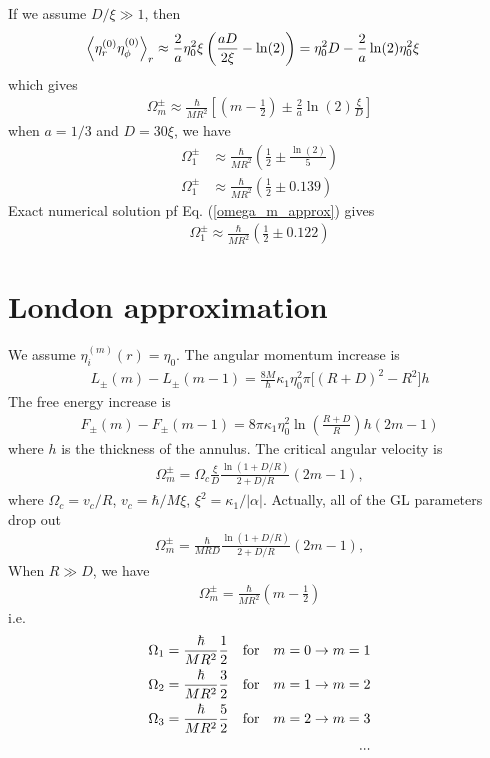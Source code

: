 \documentclass[aps,prl,preprint]{revtex4-2}
\begin{document}
If we assume $D/\xi\gg 1$, then
\begin{align}
    \ev{\eta^{(0)}_r\eta^{(0)}_\phi}_r 
    &\approx \frac{2}{a}\eta_0^2\xi\left(\frac{aD}{2\xi} - \ln(2)\right)
    = \eta_0^2D - \frac{2}{a}\ln(2)\eta_0^2\xi
\end{align}
which gives
\begin{align}
    \Omega_m^\pm \approx \frac{\hbar}{MR^2}\left[\left(m-\frac{1}{2}\right)
    \pm\frac{2}{a}\ln(2)\frac{\xi}{D}\right]
\end{align}
when $a=1/3$ and $D=30\xi$, we have
\begin{align}
    \Omega_1^\pm &\approx \frac{\hbar}{MR^2}\left(\frac{1}{2}\pm\frac{\ln(2)}{5}\right)\\
    \Omega_1^\pm &\approx \frac{\hbar}{MR^2}\left(\frac{1}{2}\pm 0.139\right)
\end{align}
Exact numerical solution pf Eq. (\ref{omega_m_approx}) gives
\begin{align}
    \Omega_1^\pm \approx \frac{\hbar}{MR^2}\left(\frac{1}{2}\pm 0.122\right)
\end{align}

\section{London approximation}
We assume $\eta_i^{(m)}(r) = \eta_0$.
The angular momentum increase is
\begin{align}
    L_\pm(m) - L_\pm(m-1)
    =\frac{8M}{\hbar}\kappa_1\eta_0^2\pi\bigg[(R+D)^2-R^2\bigg]h
\end{align}
The free energy increase is
\begin{align}
    F_\pm(m)-F_\pm(m-1)=8\pi\kappa_1\eta_0^2\ln(\frac{R+D}{R})h(2m-1)
\end{align}
where $h$ is the thickness of the annulus. The critical angular velocity is
\begin{align}
    \Omega_m^\pm=\Omega_c\frac{\xi}{D}\frac{\ln{(1+D/R)}}{2+D/R}(2m-1),
\end{align}
where $\Omega_c = v_c/R$, $v_c = \hbar/M\xi$, $\xi^2=\kappa_1/|\alpha|$.
Actually, all of the GL parameters drop out
\begin{align}
    \Omega_m^\pm=\frac{\hbar}{MRD}\frac{\ln{(1+D/R)}}{2+D/R}(2m-1),
\end{align}
When $R\gg D$, we have
\begin{align}
    \Omega_m^\pm=\frac{\hbar}{MR^2}\left(m-\frac{1}{2}\right)
\end{align}
i.e.
\begin{align}
    \Omega_1=\frac{\hbar}{MR^2}\frac{1}{2}\qq{for}m=0\rightarrow m=1\\
    \Omega_2=\frac{\hbar}{MR^2}\frac{3}{2}\qq{for}m=1\rightarrow m=2\\
    \Omega_3=\frac{\hbar}{MR^2}\frac{5}{2}\qq{for}m=2\rightarrow m=3\\
    ...
\end{align}
\end{document}
